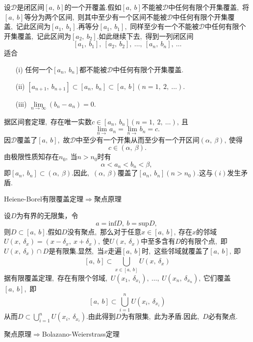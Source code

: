 \begin{solution}
	设$\mathcal{D}$是闭区间$\left[a,\ b\right]$的一个开覆盖.假如$\left[a,\ b\right]$不能被$\mathcal{D}$中任何有限个开集覆盖,\ 将$\left[a,\ b\right]$等分为两个区间,\ 则其中至少有一个区间不能被$\mathcal{D}$中任何有限个开集覆盖,\ 记此区间为$\left[a_1,\ b_1\right]$.再等分$\left[a_1,\ b_1\right]$,\ 同样至少有一个不能被$\mathcal{D}$中任何有限个开集覆盖,\ 记此区间为$\left[a_2,\ b_2\right]$.如此继续下去,\ 得到一列闭区间
	$$\left[a_1,\ b_1\right],\ \left[a_2,\ b_2\right],\ \dots,\ \left[a_n,\ b_n\right],\ \dots$$
	适合
	\begin{itemize}
		\item[(i)] 任何一个$\left[a_n,\ b_n\right]$都不能被$\mathcal{D}$中任何有限个开集覆盖.
		\item[(ii)]$\left[a_{n+1},\ b_{n+1}\right]\subset\left[a_n,\ b_n\right]\subset\left[a,\ b\right]\left(n=1,\ 2,\ \dots\right).$
		\item[(iii)]$\lim\limits_{n\rightarrow\infty}\left(b_n-a_n\right)=0.$
	\end{itemize}
	据区间套定理,\ 存在唯一实数$c\in\left[a_n,\ b_n\right]\left(n=1,\ 2,\ \dots\right),\ $且
	$$\lim\limits_{n\rightarrow}a_n=\lim\limits_{n\rightarrow}b_n=c.$$
	因$\mathcal{D}$覆盖了$\left[a,\ b\right]$,\ 故$\mathcal{D}$中至少有一个开集从而至少有一个开区间$\left(\alpha,\ \beta\right),\ $使得
	$$c \in \left(\alpha,\ \beta\right).$$
	由极限性质知存在$n_0,\ $当$n>n_0$时有
	$$\alpha<a_n<b_n<\beta,\ $$
	即$\left[a_n,\ b_n\right]\subset\left(\alpha,\ \beta\right).$因此,\ $\left(\alpha,\ \beta\right)$覆盖了$\left[a_n,\ b_n\right]\left(n>n_0\right).$这与$(i)$发生矛盾. 
\end{solution}
\newpage
\begin{problem}
	Heiene-Borel有限覆盖定理$\Rightarrow$聚点原理
\end{problem}

\begin{solution}
	设$D$为有界的无限集，令
	$$a=\text{inf}D,\ b=\text{sup}D,\ $$
	则$D\subset\left[a,\ b\right]$.假如$D$没有聚点,\ 那么对于任意$x\in\left[a,\ b\right],\ $存在$x$的邻域$U\left(x,\ \delta_x\right)=\left(x-\delta_x,\ x+\delta_x\right),\ $使$U\left(x,\ \delta_x\right)$中至多含有$D$的有限个点,\ 即$U\left(x,\ \delta_x\right)\cap D$是有限集.显然,\ 当$x$走遍$\left[a,\ b\right]$时,\ 这些邻域就覆盖了$\left[a,\ b\right],\ $即
	$$\left[a,\ b\right]\subset\bigcup_{x\in \left[a,\ b\right]}^{}U\left(x,\ \delta_x\right) $$
	据有限覆盖定理,\ 存在有限个邻域,\ $U\left(x_1,\ \delta_{x_1}\right),\ \dots,\ U\left(x_n,\ \delta_{x_n}\right),\ $它们覆盖$\left[a,\ b\right]$,\ 即
	$$\left[a,\ b\right]\subset\bigcup_{i=1}^{n}U\left(x_i,\ \delta_{x_i}\right)$$
	从而$D\subset\bigcup_{i=1}^{n}U\left(x_i,\ \delta_{x_i}\right).$由此得到$D$为有限集,\ 此为矛盾.因此,\ $D$必有聚点.
\end{solution}
\newpage
\begin{problem}
	聚点原理$\Rightarrow$Bolazano-Weierstrass定理
\end{problem}

